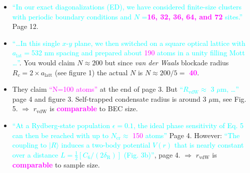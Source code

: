 \documentclass[10pt,twocolumn]{article}
\begin{document}
\begin{itemize}
\item \textbf{\cite{Glaetzle2014}} \textcolor{Cyan}{``In our exact diagonalizations (ED), we have considered finite-size clusters with periodic boundary conditions and $N$ =\textcolor{Magenta}{\textbf{16, 32, 36, 64, and 72}} sites.''} Page 12.

\item \textbf{\cite{Bloch}} \textcolor{Cyan}{``\ldots In this single $x$-$y$ plane, we then switched on a square optical lattice with $a_{\text{lat}}=$532 nm spacing and prepared about \textcolor{Magenta}{190} atoms in a unity filling Mott \ldots''}. You would claim $N\approx 200$ but since \textit{van der Waals} blockade radius $R_c=2\times a_{\text{latt}}$ (see figure 1) the actual $N$ is $N\approx 200/5 =$ \textcolor{Magenta}{\textbf{40}}.

\item \textbf{\cite{maucher2011}} They claim \textcolor{Magenta}{``N=100 atoms''} at the end of page 3. But \textcolor{Cyan}{``$R_{\text{vdW}} \approx$ 3 $\mu$m, \ldots''} page 4 and figure 3. Self-trapped condensate radius is around 3 $\mu$m, see Fig. 5. $\Longrightarrow$ $r_{\text{vdW}}$ is \textcolor{Magenta}{\textbf{comparable}} to BEC size.

\item \textbf{\cite{Davis2016}} \textcolor{Cyan}{``At a Rydberg-state population $\epsilon=0.1$, the ideal phase sensitivity of Eq. 5 can then be reached with up to $N_{\text{cr}}\approx$ \textcolor{Magenta}{150} atoms''} Page 4. However: \textcolor{Cyan}{``The coupling to $|R\rangle$ induces a two-body potential $V(r)$ that is nearly constant over a distance $L=\frac{1}{2}\left[C_6/\left(2\delta_{\text{R}}\right)\right]$ (Fig. 3b)''}, page 4. $\Longrightarrow$ $r_{\text{vdW}}$ is \textcolor{Magenta}{\textbf{comparable}} to sample size.
\end{itemize}
\end{document}
